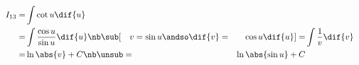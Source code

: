 \begin{samepage}
\begin{align*}
I_{13}
=& \int  \cot{u} \dif{u} \\
=& \int  \frac{\cos{u}}{\sin{u}} \dif{u}
\nb\sub[\quad  v=\sin{u} \andso \dif{v} =& \cos{u}\dif{u}  ]
=&  \int \frac{1}{v}\dif{v} \\
=&  \ln \abs{v} + C
\nb\unsub
=&  \ln \abs{\sin{u}} + C
\end{align*}


\end{samepage}
